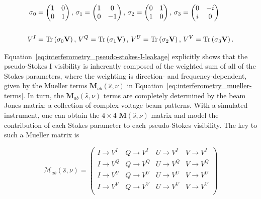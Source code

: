 \begin{equation}
\begin{split}
\sigma_0 &=\begin{pmatrix}1 & 0 \\0 & 1 \\ \end{pmatrix},\,
\sigma_1 = \begin{pmatrix} 1 & 0 \\ 0 & -1 \\ \end{pmatrix},\,
\sigma_2 = \begin{pmatrix} 0 & 1 \\ 1 & 0 \\ \end{pmatrix},\,
\sigma_3 = \begin{pmatrix} 0 & -i \\ i & 0 \\ \end{pmatrix} \\\\
V^I &= {\rm Tr}\left( \sigma_0\textbf{V} \right),\, V^Q= {\rm Tr}\left( \sigma_1\textbf{V} \right),\, V^U = {\rm Tr}\left( \sigma_2\textbf{V} \right),\, V^V = {\rm Tr}\left( \sigma_3\textbf{V} \right).
\end{split}
\end{equation}

Equation~\ref{eq:interferometry_pseudo-stokes-I-leakage} explicitly shows that the pseudo-Stokes I visibility is inherently composed of the weighted sum of all of the Stokes parameters, where the weighting is direction- and frequency-dependent, given by the Mueller terms  $\textbf{M}_{ab}(\hat{s},\nu)$ in Equation~\ref{eq:interferometry_mueller-terms}. In turn, the $\textbf{M}_{ab}(\hat{s},\nu)$ terms are completely determined by the beam Jones matrix; a collection of complex voltage beam patterns. With a simulated instrument, one can obtain the $4\times 4$ $\textbf{M}(\hat{s},\nu)$ matrix and model the contribution of each Stokes parameter to each pseudo-Stokes visibility. The key to such a Mueller matrix is

\begin{equation}
\mathcal{M}_{ab}(\hat{s},\nu) =
\begin{pmatrix}
I \rightarrow V^I & Q \rightarrow V^I & U \rightarrow V^I & V \rightarrow V^I\\
I \rightarrow V^Q & Q \rightarrow V^Q & U \rightarrow V^Q & V \rightarrow V^Q\\
I \rightarrow V^U  & Q \rightarrow V^U & U \rightarrow V^U & V \rightarrow V^U\\
I \rightarrow V^V  & Q \rightarrow V^V & U \rightarrow V^V & V \rightarrow V^V\\
\end{pmatrix}
\label{eq:interferometry_Mab}
\end{equation}

